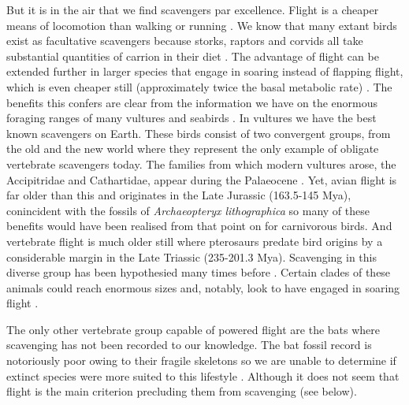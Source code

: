 \documentclass[a4paper,12pt]{article}
\begin{document}
But it is in the air that we find scavengers par excellence. 
Flight is a cheaper means of locomotion than walking or running \citep{tucker1975energetic}. 
We know that many extant birds exist as facultative scavengers because storks, raptors and corvids all take substantial quantities of carrion in their diet \citep{kendall2013alternative}.
The advantage of flight can be extended further in larger species that engage in soaring instead of flapping flight, which is even cheaper still (approximately twice the basal metabolic rate) \citep{hedenstrom1993migration,spivey2014analysing}.
The benefits this confers are clear from the information we have on the enormous foraging ranges of many vultures \citep{spiegel2013factors} and seabirds \citep{thaxter2012seabird}.
In vultures we have the best known scavengers on Earth. 
These birds consist of two convergent groups, from the old and the new world where they represent the only example of obligate vertebrate scavengers today.
The families from which modern vultures arose, the Accipitridae and Cathartidae, appear during the Palaeocene \citep[66 - 56 Mya; ][]{Jetz2012, Jarvis2014}.
Yet, avian flight is far older than this and originates in the Late Jurassic (163.5-145 Mya), conincident with the fossils of \textit{Archaeopteryx lithographica} so many of these benefits would have been realised from that point on for carnivorous birds.
And vertebrate flight is much older still where pterosaurs predate bird origins by a considerable margin in the Late Triassic (235-201.3 Mya).
Scavenging in this diverse group has been hypothesied many times before \citep{witton2008reappraisal}.
Certain clades of these animals could reach enormous sizes \citep[e.g. Azhdarchids with wingspans of 11 metres; ][]{witton2010size} and, notably, look to have engaged in soaring flight \citep{witton2010size}.

The only other vertebrate group capable of powered flight are the bats where scavenging has not been recorded to our knowledge.
The bat fossil record is notoriously poor owing to their fragile skeletons so we are unable to determine if extinct species were more suited to this lifestyle \citep{eiting2009global}. %
Although it does not seem that flight is the main criterion precluding them from scavenging (see below).
\end{document}
